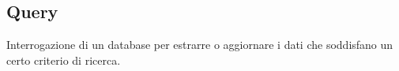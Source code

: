 \documentclass[../glossario.tex]{subfiles}
\begin{document}
\subsection*{Query}
Interrogazione di un database per estrarre o aggiornare i dati che soddisfano un certo criterio di ricerca.

    
\end{document}
